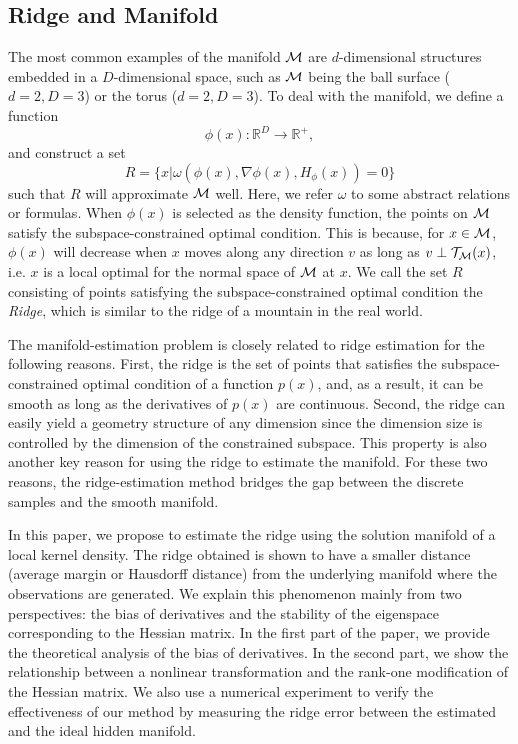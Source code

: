 \documentclass[aos,preprint]{imsart}
\theoremstyle{remark}
\begin{document}
\subsection{Ridge and Manifold}
The most common examples of the manifold $\cal M$ are $d$-dimensional structures embedded in a $D$-dimensional space, such as $\cal M$ being the ball surface ($d=2, D=3$) or the torus ($d=2, D=3$). To deal with the manifold, we define a function 
\[\phi(x): {\mathbb R}^D\rightarrow {\mathbb R}^+,
\] 
and construct a set 
\[R = \{x | \omega (\phi(x),\nabla \phi(x), H_\phi(x))=0 \}\] 
such that $R$ will approximate $\cal M$ well. Here, we refer $\omega$ to some abstract relations or formulas. When $\phi(x)$ is selected as the density function, the points on $\cal M$ satisfy the subspace-constrained optimal condition. This is because, for $x\in \cal M$, $\phi(x)$ will decrease when $x$ moves along any direction $v$ as long as $v\perp {\cal T}_{\cal M}(x)$, i.e. $x$ is a local optimal for the normal space of $\cal M$ at $x$. We call the set $R$ consisting of points satisfying the subspace-constrained optimal condition the {\it Ridge}, which is similar to the ridge of a mountain in the real world.





The manifold-estimation problem is closely related to ridge estimation for the following reasons. First, the ridge is the set of points that satisfies the subspace-constrained optimal condition of a function $p(x)$, and, as a result, it can be smooth as long as the derivatives of $p(x)$ are continuous. Second, the ridge can easily yield a geometry structure of any dimension since the dimension size is controlled by the dimension of the constrained subspace. This property is also another key reason for using the ridge to estimate the manifold. For these two reasons, the ridge-estimation method bridges the gap between the discrete samples and the smooth manifold.

In this paper, we propose to estimate the ridge using the solution manifold of a local kernel density. The ridge obtained is shown to have a smaller distance (average margin or Hausdorff distance) from the underlying manifold where the observations are generated. We explain this phenomenon mainly from two perspectives: the bias of derivatives and the stability of the eigenspace corresponding to the Hessian matrix. In the first part of the paper, we provide the theoretical analysis of the bias of derivatives. In the second part, we show the relationship between a nonlinear transformation and the rank-one modification of the Hessian matrix. We also use a numerical experiment to verify the effectiveness of our method by measuring the ridge error between the estimated and the ideal hidden manifold.
\end{document}
